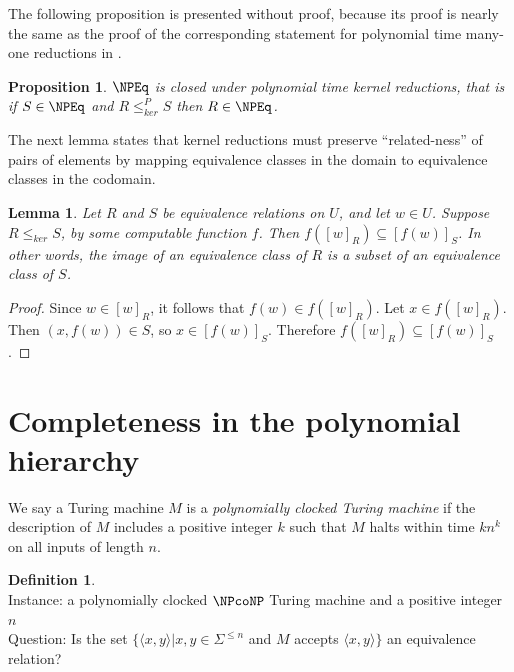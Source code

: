 \documentclass[draft]{article}
\newtheorem{lemma}[lemma]{Lemma}
\newtheorem{proposition}[proposition]{Proposition}
\theoremstyle{definition} \newtheorem{openproblem}[openproblem]{Open problem}
\theoremstyle{definition} \newtheorem{definition}[definition]{Definition}
\theoremstyle{remark} \newtheorem{remark}[remark]{Remark}
\newcommand{\kr}{\leq^{P}_{ker}} %
\newcommand{\krnt}{\leq_{ker}} %
\newcommand{\defn}[1]{\emph{#1}} %
\newcommand{\pair}[2]{\langle#1,#2\rangle} %
\newenvironment{langdef}[1]{\begin{definition}{\lang{#1}}}{\end{definition}}
\newenvironment{instance}{\\Instance:}{}
\newenvironment{question}{\\Question:}{}
\begin{document}

The following proposition is presented without proof, because its proof is nearly the same as the proof of the corresponding statement for polynomial time many-one reductions in \NP.

\begin{proposition}\label{prop:closed_under_kr}
  $\NPEq$ is closed under polynomial time kernel reductions, that is if $S\in\NPEq$ and $R\kr S$ then $R\in\NPEq$.
\end{proposition}

The next lemma states that kernel reductions must preserve ``related-ness'' of pairs of elements by mapping equivalence classes in the domain to equivalence classes in the codomain.

\begin{lemma}\label{lem:image}
  Let $R$ and $S$ be equivalence relations on $U$, and let $w\in U$.
  Suppose $R\krnt S$, by some computable function $f$.
  Then $f([w]_R)\subseteq [f(w)]_S$.
  In other words, the image of an equivalence class of $R$ is a subset of an equivalence class of $S$.
\end{lemma}
\begin{proof}
  Since $w\in [w]_R$, it follows that $f(w)\in f([w]_R)$.
  Let $x\in f([w]_R)$.
  Then $(x, f(w))\in S$, so $x\in [f(w)]_S$.
  Therefore $f([w]_R)\subseteq [f(w)]_S$.
\end{proof}

\section{Completeness in the polynomial hierarchy}

We say a Turing machine $M$ is a \defn{polynomially clocked Turing machine} if the description of $M$ includes a positive integer $k$ such that $M$ halts within time $kn^k$ on all inputs of length $n$.

\begin{langdef}{EQUIV}
  \begin{instance}
    a polynomially clocked $\NPcoNP$ Turing machine and a positive integer $n$
  \end{instance}
  \begin{question}
    Is the set $\{\pair{x}{y}|x,y\in\Sigma^{\leq n}$ and $M$ accepts $\pair{x}{y}\}$ an equivalence relation?
  \end{question}
\end{langdef}
\end{document}
